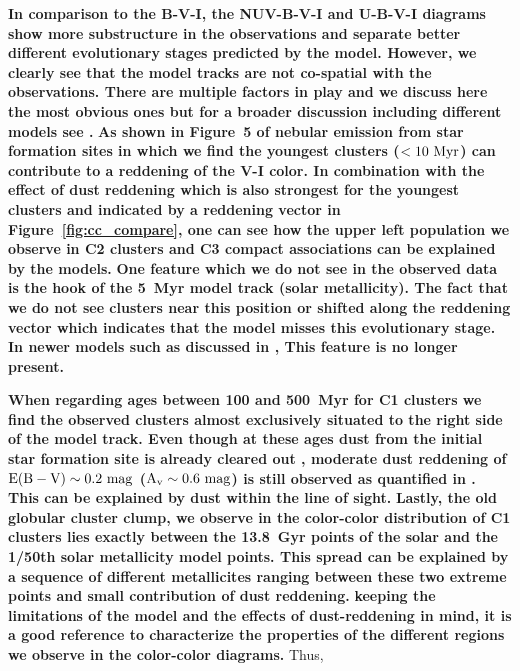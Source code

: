\textbf{In comparison to the B-V-I, the NUV-B-V-I and U-B-V-I diagrams show more substructure in the observations and separate better different evolutionary stages predicted by the  model. However, we clearly see that the model tracks are not co-spatial with the observations.
There are multiple factors in play and we discuss here the most obvious ones but for a broader discussion including different models see \citet{lee23ubvi}.}
\textbf{
As shown in Figure~5 of \citet{turner_phangs-hst_2021} nebular emission from star formation sites in which we find the youngest clusters (${\rm <10~Myr}$) can contribute to a reddening of the V-I color.  In combination with the effect of dust reddening which is also strongest for the youngest clusters and indicated by a reddening vector in Figure~\ref{fig:cc_compare}, one can see how the upper left population we observe in C2 clusters and C3 compact associations can be explained by the models.}
\textbf{One feature which we do not see in the observed data is the hook of the 5~Myr  model track (solar metallicity). The fact that we do not see clusters near this position or shifted along the reddening vector which indicates that the model misses this evolutionary stage. In newer models such as discussed in \citep{orozco-duarte_synthetic_2022}, This feature is no longer present.}

\textbf{When regarding ages between 100 and 500~Myr for C1 clusters we find the observed clusters almost exclusively situated to the right side of the  model track. Even though at these ages dust from the initial star formation site is already cleared out \citep[e.g.,][]{whitmore_using_2011,hollyhead_studying_2015,hannon_h_2022,maschmann_testing_2024}, moderate dust reddening of ${\rm E(B-V) \sim 0.2~mag}$ (${\rm A_v \sim 0.6~mag}$) is still observed as quantified in \citet{thilker23sed}. This can be explained by dust within the line of sight.}
\textbf{Lastly, the old globular cluster clump, we observe in the color-color distribution of C1 clusters lies exactly between the 13.8~Gyr points of the solar and the 1/50th solar metallicity  model points. This spread can be explained by a sequence of different metallicites ranging between these two extreme points and small contribution of dust reddening.}
\textbf{keeping the limitations of the  model and the effects of dust-reddening in mind, it is a good reference to characterize the properties of the different regions we observe in the color-color diagrams.}
Thus,

